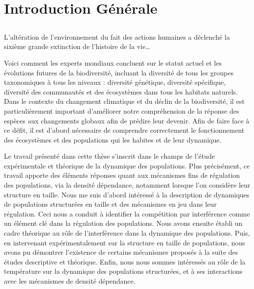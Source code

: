 \part{Introduction Générale}

\chapter*[Introduction]{}

\vspace{-5cm}

\og L'altération de l'environnement du fait des actions
humaines a déclenché la sixième grande extinction de l'histoire de la vie\ldots\fg
\autocite{stuart-chapin-iii2000a}

Voici comment les experts mondiaux concluent sur le statut actuel et les
évolutions futures de la biodiversité, incluant la diversité de tous les groupes
taxonomiques à tous les niveaux : diversité génétique, diversité spécifique,
diversité des communautés et des écosystèmes dans tous les habitats naturels.
Dans le contexte du changement climatique et du déclin de la biodiversité, il
est particulièrement important d'améliorer notre compréhension de la réponse
des espèces aux changements globaux afin de prédire leur devenir. Afin de faire
face à ce défit, il est d'abord nécessaire de comprendre correctement le
fonctionnement des écosystèmes et des populations qui les habites et de leur
dynamique. 

Le travail présenté dans cette thèse s'inscrit dans le champs de l'étude
expérimentale et théorique de la dynamique des populations. Plus précisément, ce
travail apporte des éléments réponses quant aux mécanismes fins de régulation
des populations, via la densité dépendance, notamment lorsque l'on considère
leur structure en taille.
Nous me suis d'abord intéressé à la description de dynamiques
de populations structurées en taille et des mécanismes en jeu dans leur
régulation. Ceci nous a conduit à identifier la compétition par interférence
comme un élément clé dans la régulation des populations.
Nous avons ensuite établi un cadre théorique au rôle de l'interférence dans la
dynamique des populations. Puis, en intervenant expérimentalement sur la 
structure en taille de populations, nous avons pu démontrer 
l'existence de certains mécanismes proposés à la suite des études descriptive et
théorique.
Enfin, nous nous sommes intéressés au rôle de la température sur la dynamique
des populations structurées, et à ses interactions avec les mécanismes de densité
dépendance.








